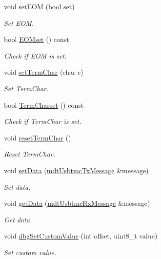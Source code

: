 \begin{DoxyCompactItemize}
void \hyperlink{classmdt_usbtmc_frame_a04907e1149ebf7ab82ec884d555eb0b3}{set\-E\-O\-M} (bool set)
\begin{DoxyCompactList}\small\item\em Set E\-O\-M. \end{DoxyCompactList}\item 
bool \hyperlink{classmdt_usbtmc_frame_a00d2e0c560bf7c57d14d072d7df3544f}{E\-O\-Mset} () const 
\begin{DoxyCompactList}\small\item\em Check if E\-O\-M is set. \end{DoxyCompactList}\item 
void \hyperlink{classmdt_usbtmc_frame_ab52a02fbc3c84155fd15446ea2380137}{set\-Term\-Char} (char c)
\begin{DoxyCompactList}\small\item\em Set Term\-Char. \end{DoxyCompactList}\item 
bool \hyperlink{classmdt_usbtmc_frame_a50a256efd2ac5ec685ee73d6f49aa8d9}{Term\-Charset} () const 
\begin{DoxyCompactList}\small\item\em Check if Term\-Char is set. \end{DoxyCompactList}\item 
void \hyperlink{classmdt_usbtmc_frame_a55bdbccc6dafccb18cef4b7a5329787f}{reset\-Term\-Char} ()
\begin{DoxyCompactList}\small\item\em Reset Term\-Char. \end{DoxyCompactList}\item 
void \hyperlink{classmdt_usbtmc_frame_a9711fa58a840a62e8fe22e5d31b259f4}{set\-Data} (\hyperlink{classmdt_usbtmc_tx_message}{mdt\-Usbtmc\-Tx\-Message} \&message)
\begin{DoxyCompactList}\small\item\em Set data. \end{DoxyCompactList}\item 
void \hyperlink{classmdt_usbtmc_frame_a7ba6f7fea904266d0c9533ac84bdf917}{get\-Data} (\hyperlink{classmdt_usbtmc_rx_message}{mdt\-Usbtmc\-Rx\-Message} \&message)
\begin{DoxyCompactList}\small\item\em Get data. \end{DoxyCompactList}\item 
void \hyperlink{classmdt_usbtmc_frame_a9784bc3383a2cecbe79bfa5afc8d1d8b}{dbg\-Set\-Custom\-Value} (int offset, uint8\-\_\-t value)
\begin{DoxyCompactList}\small\item\em Set custom value. \end{DoxyCompactList}\end{DoxyCompactItemize}


